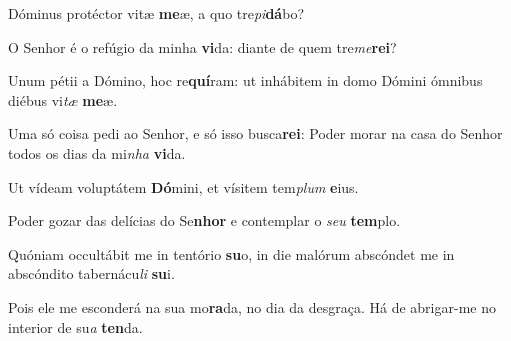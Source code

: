 \begin{greenumerate}
  \setcounter{enumi}{1}


  \item Dóminus protéctor vitæ \textbf{me}æ, {\GreStar} a quo tre\textit{pi}\textbf{dá}bo? 

  \switchcolumn\setcounter{enumi}{1}

  \item O Senhor é o refúgio da minha \textbf{vi}da: {\GreStar} diante de quem tre\textit{me}\textbf{rei}? 

  \switchcolumn*


  \item Unum pétii a Dómino, hoc re\textbf{quí}ram: {\GreStar} ut inhábitem in domo Dómini ómnibus diébus vi\textit{tæ} \textbf{me}æ. 

  \switchcolumn%

  \item Uma só coisa pedi ao Senhor, e só isso busca\textbf{rei}: {\GreStar} Poder morar na casa do Senhor todos os dias da mi\textit{nha} \textbf{vi}da. 

  \switchcolumn*


  \item Ut vídeam voluptátem \textbf{Dó}mini, {\GreStar} et vísitem tem\textit{plum} \textbf{e}ius. 

  \switchcolumn%

  \item Poder gozar das delícias do Se\textbf{nhor} {\GreStar} e contemplar o \textit{seu} \textbf{tem}plo. 

  \switchcolumn*


  \item Quóniam occultábit me in tentório \textbf{su}o, {\GreStar} in die malórum abscóndet me in abscóndito tabernácu\textit{li} \textbf{su}i. 

  \switchcolumn%

  \item Pois ele me esconderá na sua mo\textbf{ra}da, {\GreStar} no dia da desgraça. Há de abrigar-me no interior de su\textit{a} \textbf{ten}da. 

  \switchcolumn*


\end{greenumerate}
